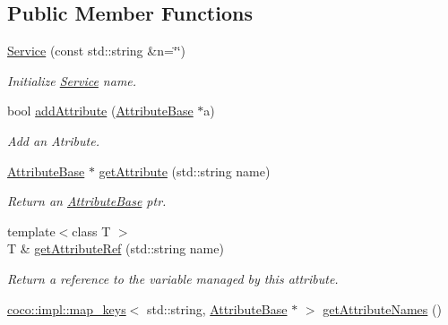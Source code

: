 \subsection*{Public Member Functions}
\begin{DoxyCompactItemize}
\item 
\hypertarget{classcoco_1_1_service_afcdc2a94142f87cf2e86da7fc7973011}{}\hyperlink{classcoco_1_1_service_afcdc2a94142f87cf2e86da7fc7973011}{Service} (const std\+::string \&n=\char`\"{}\char`\"{})\label{classcoco_1_1_service_afcdc2a94142f87cf2e86da7fc7973011}

\begin{DoxyCompactList}\small\item\em Initialize \hyperlink{classcoco_1_1_service}{Service} name. \end{DoxyCompactList}\item 
\hypertarget{classcoco_1_1_service_abba97c5449141cf2b80caa818b815b0b}{}bool \hyperlink{classcoco_1_1_service_abba97c5449141cf2b80caa818b815b0b}{add\+Attribute} (\hyperlink{classcoco_1_1_attribute_base}{Attribute\+Base} $\ast$a)\label{classcoco_1_1_service_abba97c5449141cf2b80caa818b815b0b}

\begin{DoxyCompactList}\small\item\em Add an Atribute. \end{DoxyCompactList}\item 
\hypertarget{classcoco_1_1_service_a69fa3e93fbe6942d48e2736d401e3d8c}{}\hyperlink{classcoco_1_1_attribute_base}{Attribute\+Base} $\ast$ \hyperlink{classcoco_1_1_service_a69fa3e93fbe6942d48e2736d401e3d8c}{get\+Attribute} (std\+::string name)\label{classcoco_1_1_service_a69fa3e93fbe6942d48e2736d401e3d8c}

\begin{DoxyCompactList}\small\item\em Return an \hyperlink{classcoco_1_1_attribute_base}{Attribute\+Base} ptr. \end{DoxyCompactList}\item 
\hypertarget{classcoco_1_1_service_a5a557418f6e2b7767d8a9f39d80f8a97}{}{\footnotesize template$<$class T $>$ }\\T \& \hyperlink{classcoco_1_1_service_a5a557418f6e2b7767d8a9f39d80f8a97}{get\+Attribute\+Ref} (std\+::string name)\label{classcoco_1_1_service_a5a557418f6e2b7767d8a9f39d80f8a97}

\begin{DoxyCompactList}\small\item\em Return a reference to the variable managed by this attribute. \end{DoxyCompactList}\item 
\hypertarget{classcoco_1_1_service_a15c53f198c44b03b89ae78f38aaa00a9}{}\hyperlink{structcoco_1_1impl_1_1map__keys}{coco\+::impl\+::map\+\_\+keys}$<$ std\+::string, \hyperlink{classcoco_1_1_attribute_base}{Attribute\+Base} $\ast$ $>$ \hyperlink{classcoco_1_1_service_a15c53f198c44b03b89ae78f38aaa00a9}{get\+Attribute\+Names} ()\label{classcoco_1_1_service_a15c53f198c44b03b89ae78f38aaa00a9}


\end{DoxyCompactItemize}
